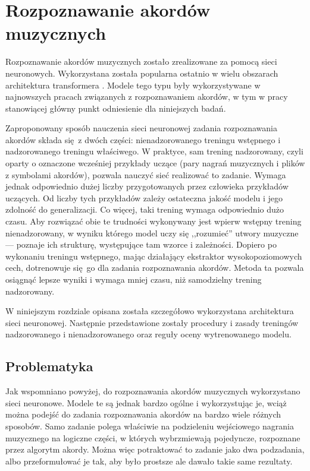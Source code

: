 \chapter{Rozpoznawanie akordów muzycznych}


Rozpoznawanie akordów muzycznych zostało zrealizowane za pomocą sieci neuronowych. Wykorzystana
została popularna ostatnio w wielu obszarach architektura transformera
\cite{vaswani_attention_2017}. Modele tego typu były wykorzystywane w najnowszych pracach związanych
z rozpoznawaniem akordów, w tym w pracy \cite{park_bi-directional_2019} stanowiącej główny punkt
odniesienie dla niniejszych badań.

Zaproponowany sposób nauczenia sieci neuronowej zadania rozpoznawania akordów składa się z dwóch
części: nienadzorowanego treningu wstępnego i nadzorowanego treningu właściwego. W praktyce, sam
trening nadzorowany, czyli oparty o oznaczone wcześniej przykłady uczące (pary nagrań muzycznych i
plików z symbolami akordów), pozwala nauczyć sieć realizować to zadanie. Wymaga jednak odpowiednio
dużej liczby przygotowanych przez człowieka przykładów uczących. Od liczby tych przykładów zależy
ostateczna jakość modelu i jego zdolność do generalizacji. Co więcej, taki trening wymaga
odpowiednio dużo czasu. Aby rozwiązać obie te trudności wykonywany jest wpierw wstępny trening
nienadzorowany, w wyniku którego model uczy się ,,rozumieć'' utwory muzyczne --- poznaje ich
strukturę, występujące tam wzorce i zależności. Dopiero po wykonaniu treningu wstępnego, mając
działający ekstraktor wysokopoziomowych cech, dotrenowuje się go dla zadania rozpoznawania akordów.
Metoda ta pozwala osiągnąć lepsze wyniki i wymaga mniej czasu, niż samodzielny trening nadzorowany.

W niniejszym rozdziale opisana została szczegółowo wykorzystana architektura sieci neuronowej.
Następnie przedstawione zostały procedury i zasady treningów nadzorowanego i nienadzorowanego oraz
reguły oceny wytrenowanego modelu.



\section{Problematyka}

Jak wspomniano powyżej, do rozpoznawania akordów muzycznych wykorzystano sieci neuronowe. Modele te
są jednak bardzo ogólne i wykorzystując je, wciąż można podejść do zadania rozpoznawania akordów na
bardzo wiele różnych sposobów. Samo zadanie polega właściwie na podzieleniu wejściowego nagrania
muzycznego na logiczne części, w których wybrzmiewają pojedyncze, rozpoznane przez algorytm akordy.
Można więc potraktować to zadanie jako dwa podzadania, albo przeformułować je tak, aby było prostsze
ale dawało takie same rezultaty. 

